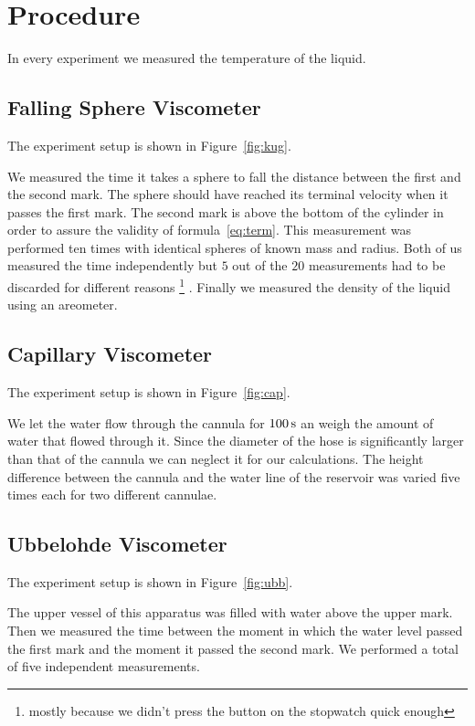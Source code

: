 \section{Procedure}
In every experiment we measured the temperature of the liquid.

\subsection{Falling Sphere Viscometer}

The experiment setup is shown in Figure~\ref{fig:kug}.

We measured the time it takes a sphere to fall the distance between the first and the second mark. The sphere should have reached its terminal velocity when it passes the first mark. The second mark is above the bottom of the cylinder in order to assure the validity of formula~\ref{eq:term}. This measurement was performed ten times with identical spheres of known mass and radius. Both of us measured the time independently but $5$ out of the $20$ measurements had to be discarded for different reasons%
\footnote{mostly because we didn't press the button on the stopwatch quick enough}%
.
Finally we measured the density of the liquid using an areometer.

\subsection{Capillary Viscometer}

The experiment setup is shown in Figure~\ref{fig:cap}.

We let the water flow through the cannula for $\unit[100]{s}$ an weigh the amount of water that flowed through it. Since the diameter of the hose is significantly larger than that of the cannula we can neglect it for our calculations. The height difference between the cannula and the water line of the reservoir was varied five times each for two different cannulae. 

\subsection{Ubbelohde Viscometer}

The experiment setup is shown in Figure~\ref{fig:ubb}.

The upper vessel of this apparatus was filled with water above the upper mark. Then we measured the time between the moment in which the water level passed the first mark and the moment it passed the second mark. We performed a total of five independent measurements.




